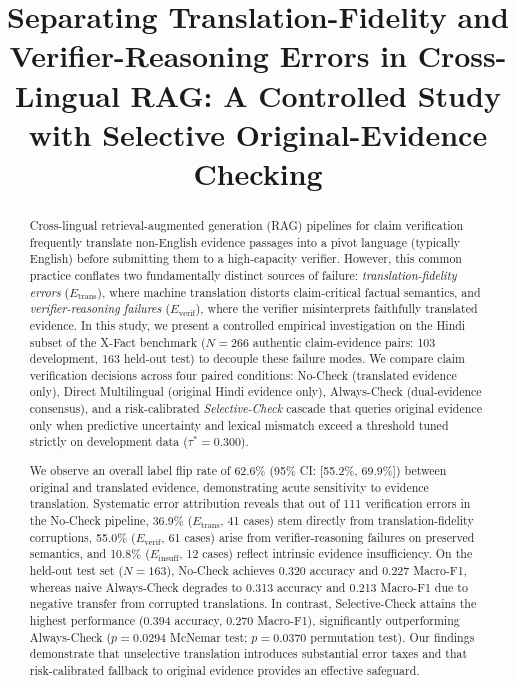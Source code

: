 \documentclass[11pt,a4paper]{article}
\title{Separating Translation-Fidelity and Verifier-Reasoning Errors in Cross-Lingual RAG: A Controlled Study with Selective Original-Evidence Checking}
\author{}
\date{}
\begin{document}
\maketitle

\begin{abstract}
Cross-lingual retrieval-augmented generation (RAG) pipelines for claim verification frequently translate non-English evidence passages into a pivot language (typically English) before submitting them to a high-capacity verifier. However, this common practice conflates two fundamentally distinct sources of failure: \emph{translation-fidelity errors} ($E_{\text{trans}}$), where machine translation distorts claim-critical factual semantics, and \emph{verifier-reasoning failures} ($E_{\text{verif}}$), where the verifier misinterprets faithfully translated evidence. In this study, we present a controlled empirical investigation on the Hindi subset of the X-Fact benchmark ($N=266$ authentic claim-evidence pairs: 103 development, 163 held-out test) to decouple these failure modes. We compare claim verification decisions across four paired conditions: No-Check (translated evidence only), Direct Multilingual (original Hindi evidence only), Always-Check (dual-evidence consensus), and a risk-calibrated \emph{Selective-Check} cascade that queries original evidence only when predictive uncertainty and lexical mismatch exceed a threshold tuned strictly on development data ($\tau^*=0.300$).

We observe an overall label flip rate of 62.6\% (95\% CI: [55.2\%, 69.9\%]) between original and translated evidence, demonstrating acute sensitivity to evidence translation. Systematic error attribution reveals that out of 111 verification errors in the No-Check pipeline, 36.9\% ($E_{\text{trans}}$, 41 cases) stem directly from translation-fidelity corruptions, 55.0\% ($E_{\text{verif}}$, 61 cases) arise from verifier-reasoning failures on preserved semantics, and 10.8\% ($E_{\text{insuff}}$, 12 cases) reflect intrinsic evidence insufficiency. On the held-out test set ($N=163$), No-Check achieves 0.320 accuracy and 0.227 Macro-F1, whereas naive Always-Check degrades to 0.313 accuracy and 0.213 Macro-F1 due to negative transfer from corrupted translations. In contrast, Selective-Check attains the highest performance (0.394 accuracy, 0.270 Macro-F1), significantly outperforming Always-Check ($p = 0.0294$ McNemar test; $p = 0.0370$ permutation test). Our findings demonstrate that unselective translation introduces substantial error taxes and that risk-calibrated fallback to original evidence provides an effective safeguard.
\end{abstract}
\end{document}
